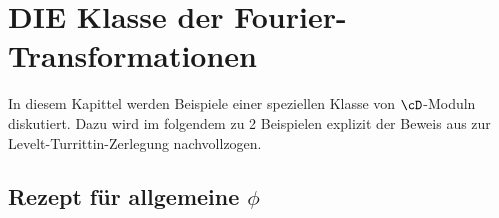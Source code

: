 \chapter{DIE Klasse der Fourier-Transformationen}
In diesem Kapittel werden Beispiele einer speziellen Klasse von $\cD$-Moduln
diskutiert. Dazu wird im folgendem zu 2 Beispielen explizit der Beweis aus
\cite{sabbah_cimpa90} zur Levelt-Turrittin-Zerlegung nachvollzogen.
\begin{comment}
Eine weitere
explizite Berechnung findet sich bei \cite[5.b oder 5.c]{sabbah_cimpa90}.
\end{comment}

\section{Rezept für allgemeine $\phi$} \label{sec:allgemeinProblem}

\begin{comment}
siehe: \cite[5.b]{sabbah_Fourier-local}

bzeug zu $\sE^\phi$??
\end{comment}

\begin{comment}
sei $\phi\in\{\frac{1}{t^k},\frac{1}{t^2}+\frac{1}{t^3},\dots\}$
\begin{enumerate}
\item Starte mit: $P(t,\partial_t):=(\partial_t-\frac{d}{dt}\phi(t)) \cdot
\mbox{Hauptnenner }\in\C[t]<\partial_t>$
\item Furiertrafo: $F_P(z,\partial_z)=P(\partial_z,-z)\in\C[z]<\partial_z>$
\item $x=z^{-1}$ und $\partial_x=-z^2\partial_z$ \\
\[
Q(x,\partial_x):=F_P(x^{-1},-x^2\partial_x)\cdot \mbox{Hauptnenner
}\in\C[x]<\partial_x>
\]

\textbf{Hauptnenner unnötig?!?}
\item Berechne für $Q$ das NP usw...
\end{enumerate}
\end{comment}

